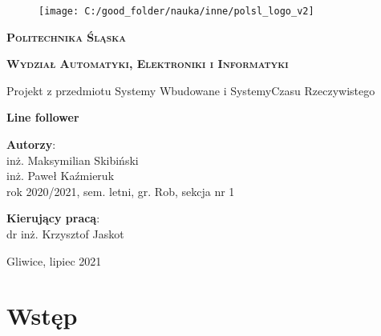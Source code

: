 \documentclass[11pt]{article}
\begin{document}

\begin{titlepage}
{\LARGE
\begin{center}
	\begin{figure}[h!]
		\centering
		\texttt{[image: C:/good\_folder/nauka/inne/polsl\_logo\_v2]}
	\end{figure}
	
	\vspace{0.25cm}
	
	\textbf{\textsc{Politechnika Śląska}}
	
	\textbf{\textsc{Wydział Automatyki, Elektroniki i Informatyki}}
	
	\vspace{1.5cm}
	
	Projekt z przedmiotu Systemy Wbudowane i Systemy\linebreak Czasu Rzeczywistego
	
	\vspace{1.5cm}
	
	\textbf{Line follower}
\end{center}
}

\vfill

{\Large
\noindent \textbf{Autorzy}:\\
\hspace*{0.5cm} inż. Maksymilian Skibiński\\
\hspace*{0.5cm} inż. Paweł Kaźmieruk\\
rok 2020/2021, sem. letni, gr. Rob, sekcja nr 1

\vspace{0.5cm}

\noindent \textbf{Kierujący pracą}:\\
\hspace*{0.5cm} dr inż. Krzysztof Jaskot

\vspace{0.5cm}
}

\begin{center}
Gliwice, lipiec 2021
\end{center}
\end{titlepage}





\setcounter{page}{2}

\tableofcontents

\newpage

\section{Wstęp}
\end{document}
